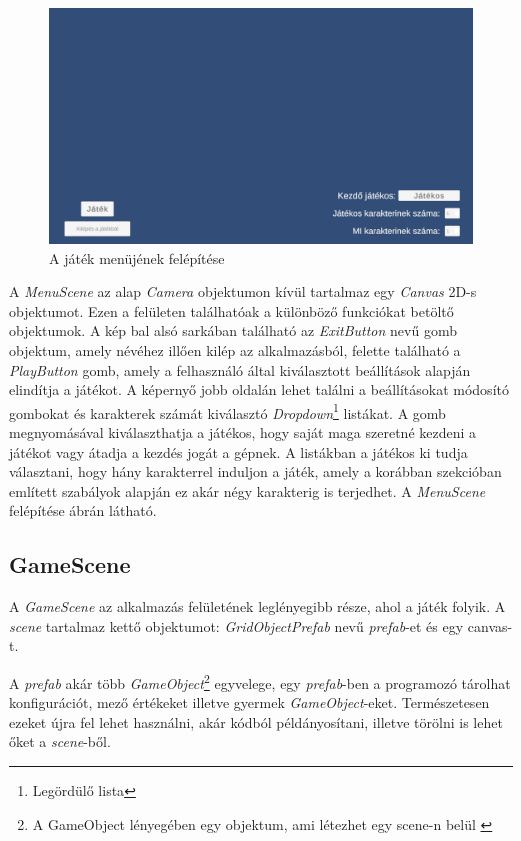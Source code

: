 \documentclass[
]{thesis-ekf}
\theoremstyle{definition}
\theoremstyle{remark}
\begin{document}
\begin{figure}[h!]
	\centering
	\includegraphics[width=15cm]{./pictures/game_menu.png}
	\caption{A játék menüjének felépítése}
	\label{menuscene}
\end{figure}

A \emph{MenuScene} az alap \emph{Camera} objektumon kívül tartalmaz egy \emph{Canvas} 2D-s objektumot. Ezen a felületen találhatóak a különböző funkciókat betöltő objektumok. A kép bal alsó sarkában található az \emph{ExitButton} nevű gomb objektum, amely névéhez illően kilép az alkalmazásból, felette található a \emph{PlayButton} gomb, amely a felhasználó által kiválasztott beállítások alapján elindítja a játékot. A képernyő jobb oldalán lehet találni a beállításokat módosító gombokat és karakterek számát kiválasztó \emph{Dropdown}\footnote{Legördülő lista} listákat. A gomb megnyomásával kiválaszthatja a játékos, hogy saját maga szeretné kezdeni a játékot vagy átadja a kezdés jogát a gépnek. A listákban a játékos ki tudja választani, hogy hány karakterrel induljon a játék, amely a korábban  szekcióban említett szabályok alapján ez akár négy karakterig is terjedhet. A \emph{MenuScene} felépítése  ábrán látható.

\subsection{GameScene}

A \emph{GameScene} az alkalmazás felületének leglényegibb része, ahol a játék folyik. A \emph{scene} tartalmaz kettő objektumot: \emph{GridObjectPrefab} nevű \emph{prefab}-et és egy canvas-t. 

A \emph{prefab} akár több \emph{GameObject}\footnote{A GameObject lényegében egy objektum, ami létezhet egy scene-n belül \cite{UnityDocsGameObject}} egyvelege, egy \emph{prefab}-ben a programozó tárolhat konfigurációt, mező értékeket illetve gyermek \emph{GameObject}-eket. Természetesen ezeket újra fel lehet használni, akár kódból példányosítani, illetve törölni is lehet őket a \emph{scene}-ből. \cite{UnityDocsPrefab} 
\end{document}
